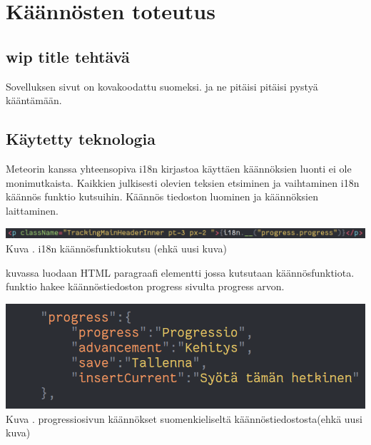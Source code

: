\documentclass[11pt,a4paper,titlepage,oneside]{article}
\begin{document}
\newpage






\section{Käännösten toteutus}

\subsection{wip title tehtävä}
Sovelluksen sivut on kovakoodattu suomeksi. ja ne pitäisi pitäisi pystyä kääntämään.
\medskip


\subsection{Käytetty teknologia}
Meteorin kanssa yhteensopiva i18n kirjastoa käyttäen käännöksien luonti ei ole monimutkaista.
Kaikkien julkisesti olevien teksien etsiminen ja vaihtaminen i18n käännös funktio kutsuihin.
Käännös tiedoston luominen ja käännöksien laittaminen.
\medskip
\bigskip


\includegraphics[width = 15cm]{src/public/oppar/translationcall.png}\\
Kuva \getImgCount. {} i18n käännösfunktiokutsu (ehkä uusi kuva)
\medskip

kuvassa luodaan HTML paragraafi elementti jossa kutsutaan käännösfunktiota. funktio hakee käännöstiedoston progress sivulta progress arvon.
\bigskip


\includegraphics[width = 15cm]{src/public/oppar/translationfile.png}\\
Kuva \getImgCount. {} progressiosivun käännökset suomenkieliseltä käännöstiedostosta(ehkä uusi kuva)
\medskip
\end{document}
